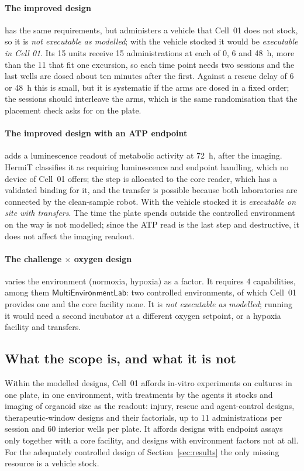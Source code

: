 \documentclass[10pt,a4paper]{article}
\begin{document}
\paragraph{The improved design} has the same requirements, but administers a vehicle that Cell~01 does not stock, so
it is \emph{not executable as modelled}; with the vehicle stocked it would be
\emph{executable in Cell 01}. Its 15 units receive 15
administrations at each of 0, 6 and 48~h, more than the 11 that fit one excursion, so each time point needs two
sessions and the last wells are dosed about ten minutes after the first. Against a rescue delay of 6 or 48~h this is
small, but it is systematic if the arms are dosed in a fixed order; the sessions should interleave the arms, which is
the same randomisation that the placement check asks for on the plate.

\paragraph{The improved design with an ATP endpoint} adds a luminescence readout of metabolic activity at 72~h,
after the imaging. HermiT classifies it as requiring luminescence and endpoint handling, which no device of Cell~01
offers; the step is allocated to the core reader, which has a validated binding for it, and the transfer is possible
because both laboratories are connected by the clean-sample robot. With the vehicle stocked it is \emph{executable on
site with transfers}. The time the plate spends outside the controlled environment on the way is not modelled; since
the ATP read is the last step and destructive, it does not affect the imaging readout.

\paragraph{The challenge $\times$ oxygen design} varies the environment (normoxia, hypoxia) as a factor. It requires
4 capabilities, among them $\mathsf{MultiEnvironmentLab}$: two controlled
environments, of which Cell~01 provides one and the core facility none. It is \emph{not executable as modelled};
running it would need a second incubator at a different oxygen setpoint, or a hypoxia facility and transfers.

\subsection{What the scope is, and what it is not}
Within the modelled designs, Cell~01 affords in-vitro experiments on cultures in one plate, in one environment, with
treatments by the agents it stocks and imaging of organoid size as the readout: injury, rescue and agent-control
designs, therapeutic-window designs and their factorials, up to 11 administrations per session and
60 interior wells per plate. It affords designs with endpoint assays only together with a core
facility, and designs with environment factors not at all. For the adequately controlled design of
Section~\ref{sec:results} the only missing resource is a vehicle stock.
\end{document}
